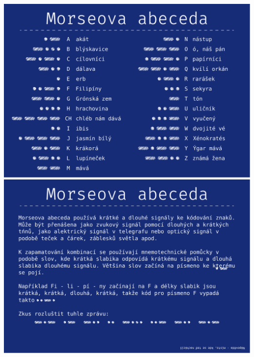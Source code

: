 \documentclass[a4paper]{article}
\begin{document}
	\noindent
	\includegraphics[width=\textwidth]{ciphers/morseovka_0.pdf}
	\includegraphics[width=\textwidth]{ciphers/morseovka_1.pdf}
	
\end{document}
